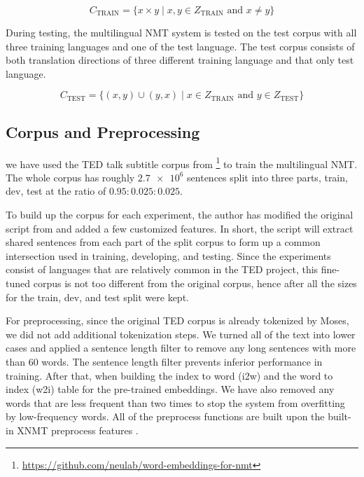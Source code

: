 \documentclass[thesis,fonts=libertine]{cluu}
\begin{document}
\begin{equation*}
  C_{\text{TRAIN}} = \{x \times y \mid x, y \in Z_{\text{TRAIN}} \text{ and } x \neq y\}
\end{equation*}

During testing, the multilingual NMT system is tested on the test corpus with all three training languages and one of the test language. The test corpus consists of both translation directions of three different training language and that only test language.

\begin{equation*}
  C_{\text{TEST}} = \{(x, y)\cup(y,x) \mid x \in Z_{\text{TRAIN}} \text{ and } y \in Z_{\text{TEST}}\}
\end{equation*}

\subsection{Corpus and Preprocessing}

we have used the TED talk subtitle corpus from \textcite{Qi:2018aa} \footnote{\url{https://github.com/neulab/word-embeddings-for-nmt}} to train the multilingual NMT. The whole corpus has roughly $\num{2.7e6}$ sentences split into three parts, train, dev, test at the ratio of $0.95:0.025:0.025$.

To build up the corpus for each experiment, the author has modified the original script from \textcite{Qi:2018aa} and added a few customized features. In short, the script will extract shared sentences from each part of the split corpus to form up a common intersection used in training, developing, and testing. Since the experiments consist of languages that are relatively common in the TED project, this fine-tuned corpus is not too different from the original corpus, hence after all the sizes for the train, dev, and test split were kept.

For preprocessing, since the original TED corpus is already tokenized by Moses, we did not add additional tokenization steps. We turned all of the text into lower cases and applied a sentence length filter to remove any long sentences with more than 60 words. The sentence length filter prevents inferior performance in training. After that, when building the index to word (i2w) and the word to index (w2i) table for the pre-trained embeddings. We have also removed any words that are less frequent than two times to stop the system from overfitting by low-frequency words. All of the preprocess functions are built upon the built-in XNMT preprocess features \parencite{Neubig:2018aa}.
\end{document}
